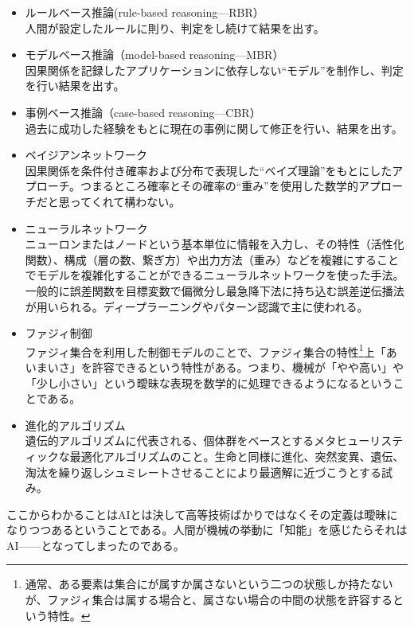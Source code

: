 \documentclass[dvipdfmx,jb5]{jreport}
\begin{document}
\begin{itemize}
      \item ルールベース推論(rule-based reasoning---RBR）\\
            人間が設定したルールに則り、判定をし続けて結果を出す。
      \item モデルベース推論（model-based  reasoning---MBR）\\
            因果関係を記録したアプリケーションに依存しない``モデル''を制作し、判定を行い結果を出す。
      \item 事例ベース推論（case-based  reasoning---CBR）\\
            過去に成功した経験をもとに現在の事例に関して修正を行い、結果を出す。
      \item ベイジアンネットワーク\\
            因果関係を条件付き確率および分布で表現した``ベイズ理論''をもとにしたアプローチ。つまるところ確率とその確率の``重み''を使用した数学的アプローチだと思ってくれて構わない。
      \item ニューラルネットワーク\\
            ニューロンまたはノードという基本単位に情報を入力し、その特性（活性化関数）、構成（層の数、繋ぎ方）や出力方法（重み）などを複雑にすることでモデルを複雑化することができるニューラルネットワークを使った手法。一般的に誤差関数を目標変数で偏微分し最急降下法に持ち込む誤差逆伝播法が用いられる。ディープラーニングやパターン認識で主に使われる。
      \item ファジィ制御\\
            ファジィ集合を利用した制御モデルのことで、ファジィ集合の特性\footnote{通常、ある要素は集合にが属すか属さないという二つの状態しか持たないが、ファジィ集合は属する場合と、属さない場合の中間の状態を許容するという特性。}上「あいまいさ」を許容できるという特性がある。つまり、機械が「やや高い」や「少し小さい」という曖昧な表現を数学的に処理できるようになるということである。
      \item 進化的アルゴリズム\\
            遺伝的アルゴリズムに代表される、個体群をベースとするメタヒューリスティックな最適化アルゴリズムのこと。生命と同様に進化、突然変異、遺伝、淘汰を繰り返しシュミレートさせることにより最適解に近づこうとする試み。
\end{itemize}

ここからわかることはAIとは決して高等技術ばかりではなくその定義は曖昧になりつつあるということである。人間が機械の挙動に「知能」を感じたらそれはAI------となってしまったのである。
\end{document}
